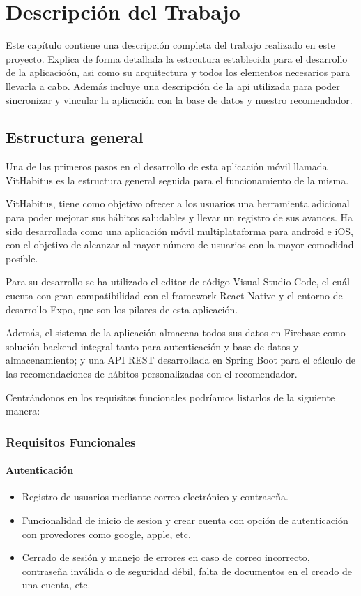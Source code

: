 \chapter{Descripción del Trabajo}
\label{cap:descripcionTrabajo}

Este capítulo contiene una descripción completa del trabajo realizado en este proyecto. Explica de forma detallada la estrcutura establecida para el desarrollo de la aplicacioón, asi como su arquitectura y todos los elementos necesarios para llevarla a cabo. 
Además incluye una descripción de la api utilizada para poder sincronizar y vincular la aplicación con la base de datos y nuestro recomendador.
\section{Estructura general}

Una de las primeros pasos en el desarrollo de esta aplicación móvil llamada VitHabitus es la estructura general seguida para el funcionamiento de la misma.

VitHabitus, tiene como objetivo ofrecer a los usuarios una herramienta adicional para poder mejorar sus hábitos saludables y llevar un registro de sus avances. Ha sido desarrollada como una aplicación móvil multiplataforma para android e iOS, con el objetivo de alcanzar al mayor número de usuarios con la mayor comodidad posible.

Para su desarrollo se ha utilizado el editor de código Visual Studio Code, el cuál cuenta con gran compatibilidad con el framework React Native y el entorno de desarrollo Expo, que son los  pilares de esta aplicación.

Además, el sistema de la aplicación almacena todos sus datos en Firebase como solución backend integral tanto para autenticación y base de datos y almacenamiento; y una API REST desarrollada en Spring Boot para el cálculo de las recomendaciones de hábitos personalizadas con el recomendador.

Centrándonos en los requisitos funcionales podríamos listarlos de la siguiente manera:

\subsection{Requisitos Funcionales}

\subsubsection{Autenticación}
\begin{itemize}
    \item Registro de usuarios mediante correo electrónico y contraseña.
    \item Funcionalidad de inicio de sesion y crear cuenta con opción de autenticación con provedores como google, apple, etc.
    \item Cerrado de sesión y manejo de errores en caso de correo incorrecto, contraseña inválida o de seguridad débil, falta de documentos en el creado de una cuenta, etc.
\end{itemize}

